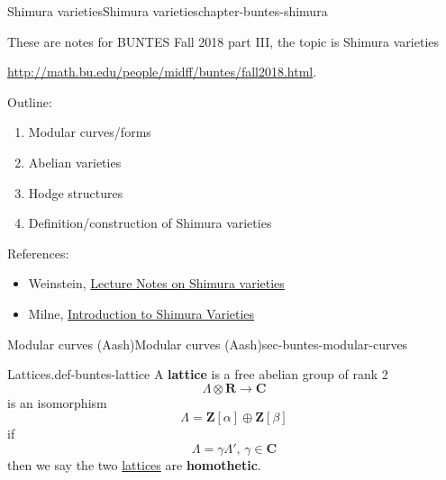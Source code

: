 \documentclass[oneside,10pt,]{book}
\newcommand{\terminology}[1]{\textbf{#1}}
\numberwithin{equation}{section}
\newcommand{\lb}{[}
\newcommand{\rb}{]}
\newcommand{\ZZ}{\mathbf{Z}}
\newcommand{\RR}{\mathbf{R}}
\newcommand{\CC}{\mathbf{C}}
\begin{document}
\begin{chapterptx}{Shimura varieties}{}{Shimura varieties}{}{}{chapter-buntes-shimura}
\begin{introduction}{}%
\hypertarget{p-1018}{}%
These are notes for BUNTES Fall 2018 part III, the topic is Shimura varieties%
\par
\hypertarget{p-1019}{}%
\url{http://math.bu.edu/people/midff/buntes/fall2018.html}.%
\par
\hypertarget{p-1020}{}%
Outline:\leavevmode%
\begin{enumerate}
\item\hypertarget{li-259}{}Modular curves/forms%
\item\hypertarget{li-260}{}Abelian varieties%
\item\hypertarget{li-261}{}Hodge structures%
\item\hypertarget{li-262}{}Definition/construction of Shimura varieties%
\end{enumerate}
%
\par
\hypertarget{p-1021}{}%
References:\leavevmode%
\begin{itemize}[label=\textbullet]
\item{}Weinstein, \href{http://math.bu.edu/people/jsweinst/Teaching/MA843Fall13/index.html}{Lecture Notes on Shimura varieties}%
\item{}Milne, \href{https://www.jmilne.org/math/xnotes/svi.pdf}{Introduction to Shimura Varieties}%
\end{itemize}
%
\end{introduction}%
%
%
\typeout{************************************************}
\typeout{************************************************}
%
\begin{sectionptx}{Modular curves (Aash)}{}{Modular curves (Aash)}{}{}{sec-buntes-modular-curves}
\begin{definition}{Lattices.}{def-buntes-lattice}%
\hypertarget{p-1022}{}%
A \terminology{lattice} is a free abelian group of rank 2%
\begin{equation*}
\Lambda \otimes \RR \to \CC
\end{equation*}
is an isomorphism%
\begin{equation*}
\Lambda = \ZZ\lb \alpha \rb  \oplus \ZZ\lb \beta \rb
\end{equation*}
if%
\begin{equation*}
\Lambda = \gamma \Lambda ',\,\gamma \in \CC
\end{equation*}
then we say the two \hyperref[def-buntes-lattice]{lattices} are \terminology{homothetic}.%

\end{definition}
\end{sectionptx}
\end{chapterptx}
\end{document}
